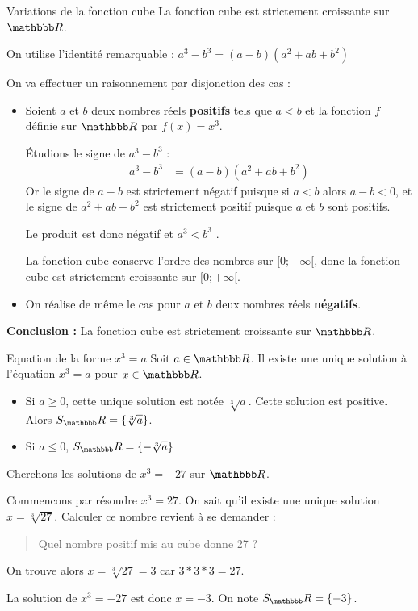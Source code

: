 \documentclass[10pt,a4paper,openany,twoside]{book}
\begin{document}
	\begin{prop}{Variations de la fonction cube}{}
		La fonction cube est strictement croissante sur $\R$.
	\end{prop}

	\begin{dem}{}{}
	\noindent On utilise l'identité remarquable : $a^3 - b^3 = (a - b)(a^2 + ab + b^2)$

	\noindent On va effectuer un raisonnement par disjonction des cas :

	\begin{itemize}
		\item Soient $a$ et $b$ deux nombres réels \textbf{positifs} tels que $a<b$ et la fonction $f$ définie sur $\R$ par $f(x)=x^3$.

		Étudions le signe de  $a^3 - b^3$ :
		\begin{align*}
		a^3 - b^3 &= (a - b)(a^2 + ab + b^2)
		\end{align*}
		Or le signe de $a - b$  est strictement négatif puisque si $a < b$ alors $a - b < 0$, et le signe de  $a^2 + ab + b^2$ est strictement positif puisque $a$ et $b$ sont positifs.

		\noindent Le produit est donc négatif et $a^3 < b^3$ .

		\medskip
		\noindent La fonction cube conserve l'ordre des nombres sur $[0 ;+\infty[$, donc la fonction cube est strictement croissante sur $[0 ;+\infty[$.
		\item On réalise de même le cas pour $a$ et $b$ deux nombres réels \textbf{négatifs}.
	\end{itemize}

	\medskip
	\textbf{Conclusion :} La fonction cube est strictement croissante sur $\R$.
	\end{dem}

	\begin{prop}{Equation de la forme $x^3=a$}{}
		Soit $a\in\R$. Il existe une unique solution à l'équation $x^3=a$ pour $x\in\R$.
		\begin{itemize}
			\item Si $a \ge 0$, cette unique solution est notée $\sqrt[3]{a}$. Cette solution est positive. Alors $S_\R = \{ \sqrt[3]{a} \}$.
			\item Si $a \le 0$, $S_\R = \{ -\sqrt[3]{a} \}$
		\end{itemize}
	\end{prop}

	\begin{ex}{}{}
		Cherchons les solutions de $x^3=-27$ sur $\R$.

		\medskip
		Commencons par résoudre $x^3=27$. On sait qu'il existe une unique solution $x=\sqrt[3]{27}$. Calculer ce nombre revient à se demander :
		\vspace{-2mm}
		\begin{quotation}Quel nombre positif mis au cube donne 27 ?\end{quotation}
		\vspace{-2mm}
		On trouve alors $x = \sqrt[3]{27} = 3$ car $3*3*3=27$.

		\medskip
		La solution de $x^3=-27$ est donc $x=-3$. On note $S_\R = \{ -3 \}$.
	\end{ex}
\end{document}
